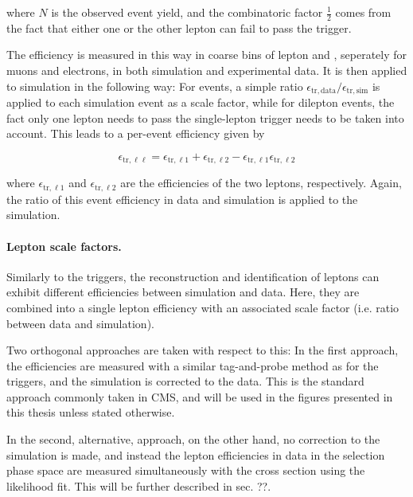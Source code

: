 where $N$ is the observed event yield, and the combinatoric factor $\frac{1}{2}$ comes from the fact that either one or the other lepton can fail to pass the trigger. 

The efficiency is measured in this way in coarse bins of lepton \pt and \abseta, seperately for muons and electrons, in both simulation and experimental data. It is then applied to simulation in the following way: For \ljets events, a simple ratio $\epsilon_{\mathrm{tr,data}} / \epsilon_{\mathrm{tr,sim}}$ is applied to each simulation event as a scale factor, while for dilepton events, the fact only one lepton needs to pass the single-lepton trigger needs to be taken into account. This leads to a per-event efficiency given by

\begin{equation}
\label{eq:ttxs:triggersf}
    \epsilon_{\mathrm{tr,\ell \ell}} = \epsilon_{\mathrm{tr,\ell 1}} + \epsilon_{\mathrm{tr,\ell 2}} - \epsilon_{\mathrm{tr,\ell 1}} \epsilon_{\mathrm{tr,\ell 2}}
\end{equation}

where $\epsilon_{\mathrm{tr,\ell 1}}$ and $\epsilon_{\mathrm{tr,\ell 2}}$ are the efficiencies of the two leptons, respectively. Again, the ratio of this event efficiency in data and simulation is applied to the simulation.

\paragraph{Lepton scale factors.}

Similarly to the triggers, the reconstruction and identification of leptons can exhibit different efficiencies between simulation and data. Here, they are combined into a single lepton efficiency with an associated scale factor (i.e. ratio between data and simulation).

Two orthogonal approaches are taken with respect to this: In the first approach, the efficiencies are measured with a similar tag-and-probe method as for the triggers, and the simulation is corrected to the data. This is the standard approach commonly taken in CMS, and will be used in the figures presented in this thesis unless stated otherwise.

In the second, alternative, approach, on the other hand, no correction to the simulation is made, and instead the lepton efficiencies in data in the selection phase space are measured simultaneously with the cross section using the likelihood fit. This will be further described in sec. ??.

